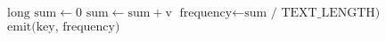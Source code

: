 \begin{algorithm}
\begin{algorithmic}[1]
        \EndProcedure
    
        \Statex
        \State $\text{long sum} \gets 0$
            \State $\text{sum} \gets \text{sum} + \text{v}$
        \EndFor
        \State  $\text{frequency} \gets \text{sum / TEXT\_LENGTH)}$
        \State $\text{emit(key, frequency)}$
        \EndProcedure
    \EndClass
    \end{algorithmic}
    
    \end{algorithm}












